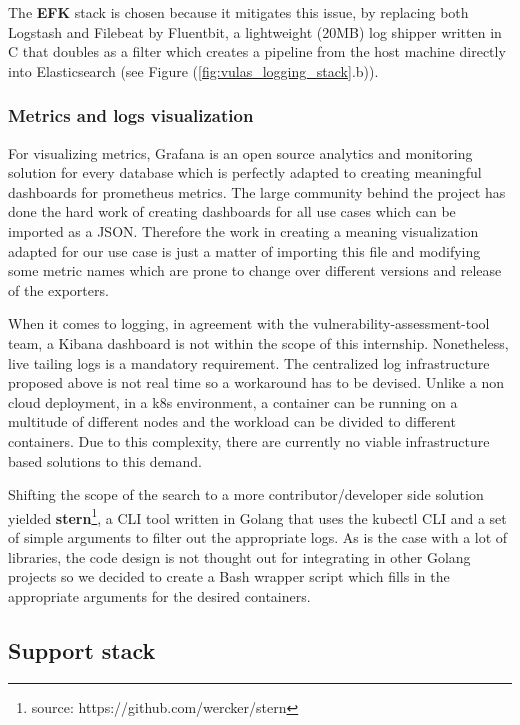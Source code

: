 \documentclass[11pt]{article}
\begin{document}
The \textbf{EFK} stack is chosen because it mitigates this issue, by replacing both Logstash and Filebeat by Fluentbit, a lightweight (20MB) log shipper written in C that doubles as a filter which creates a pipeline from the host machine directly into Elasticsearch (see Figure (\ref{fig:vulas_logging_stack}.b)). 


\subsubsection{Metrics and logs visualization}

For visualizing metrics, Grafana is an open source analytics and monitoring solution for every database which is perfectly adapted to creating meaningful dashboards for prometheus metrics. The large community behind the project has done the hard work of creating dashboards for all use cases which can be imported as a JSON. Therefore the work in creating a meaning visualization adapted for our use case is just a matter of importing this file and modifying some metric names which are prone to change over different versions and release of the exporters.

When it comes to logging, in agreement with the vulnerability-assessment-tool team, a Kibana dashboard is not within the scope of this internship. Nonetheless, live tailing logs is a mandatory requirement. The centralized log infrastructure proposed above is not real time so a workaround has to be devised. Unlike a non cloud deployment, in a k8s environment, a container can be running on a multitude of different nodes and the workload can be divided to different containers. Due to this complexity, there are currently no viable infrastructure based solutions to this demand. 

Shifting the scope of the search to a more contributor/developer side solution yielded \textbf{stern}\footnote{source: https://github.com/wercker/stern}, a CLI tool written in Golang that uses the kubectl CLI and a set of simple arguments to filter out the appropriate logs. As is the case with a lot of libraries, the code design is not thought out for integrating in other Golang projects so we decided to create a Bash wrapper script which fills in the appropriate arguments for the desired containers.

\subsection{Support stack}
\end{document}
